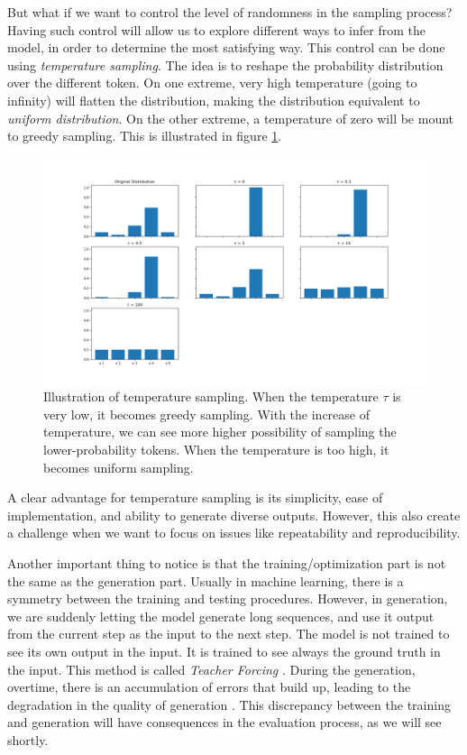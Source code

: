 \par But what if we want to control the level of randomness in the sampling process? Having such control will allow us to explore different ways to infer from the model, in order to determine the most satisfying way. This control can be done using \textit{temperature sampling}. The idea is to reshape the probability distribution over the different token. On one extreme, very high temperature (going to infinity) will flatten the distribution, making the distribution equivalent to \textit{uniform distribution}. On the other extreme, a temperature of zero will be mount to greedy sampling. This is illustrated in figure \ref{fig:temperature_sampling}.

\begin{figure}
    \centering
    \includegraphics[scale=0.5]{images/gbem/temperature_sampling.png}
    \caption{Illustration of temperature sampling. When the temperature $\tau$ is very low, it becomes greedy sampling. With the increase of temperature, we can see more higher possibility of sampling the lower-probability tokens. When the temperature is too high, it becomes uniform sampling.}
    \label{fig:temperature_sampling}
\end{figure}

\par A clear advantage for temperature sampling is its simplicity, ease of implementation, and ability to generate diverse outputs. However, this also create a challenge when we want to focus on issues like repeatability and reproducibility.

\par Another important thing to notice is that the training/optimization part is not the same as the generation part. Usually in machine learning, there is a symmetry between the training and testing procedures. However, in generation, we are suddenly letting the model generate long sequences, and use it output from the current step as the input to the next step. The model is not trained to see its own output in the input. It is trained to see always the ground truth in the input. This method is called \textit{Teacher Forcing} \citep{Williams:1989:LAC:1351124.1351135,Goodfellow-et-al-2016}. During the generation, overtime, there is an accumulation of errors that build up, leading to the degradation in the quality of generation \citep{DBLP:journals/corr/RanzatoCAZ15}. This discrepancy between the training and generation will have consequences in the evaluation process, as we will see shortly.

